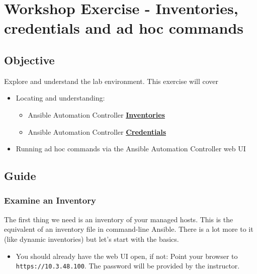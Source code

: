 \hypertarget{workshop-exercise---inventories-credentials-and-ad-hoc-commands}{%
\section{Workshop Exercise - Inventories, credentials and ad hoc
commands}\label{workshop-exercise---inventories-credentials-and-ad-hoc-commands}}

\hypertarget{objective}{%
\subsection{Objective}\label{objective}}

Explore and understand the lab environment. This exercise will cover

\begin{itemize}
\item
  Locating and understanding:

  \begin{itemize}
  \tightlist
  \item
    Ansible Automation Controller
    \href{https://docs.ansible.com/automation-controller/latest/html/userguide/inventories.html}{\textbf{Inventories}}
  \item
    Ansible Automation Controller
    \href{https://docs.ansible.com/automation-controller/latest/html/userguide/credentials.html}{\textbf{Credentials}}
  \end{itemize}
\item
  Running ad hoc commands via the Ansible Automation Controller web UI
\end{itemize}

\hypertarget{guide}{%
\subsection{Guide}\label{guide}}

\hypertarget{examine-an-inventory}{%
\subsubsection{Examine an Inventory}\label{examine-an-inventory}}

The first thing we need is an inventory of your managed hosts. This is
the equivalent of an inventory file in command-line Ansible. There is a
lot more to it (like dynamic inventories) but let's start with the
basics.

\begin{itemize}
\tightlist
\item
  You should already have the web UI open, if not: Point your browser to
  \texttt{https://10.3.48.100}. The password will be provided by the instructor.
\end{itemize}

